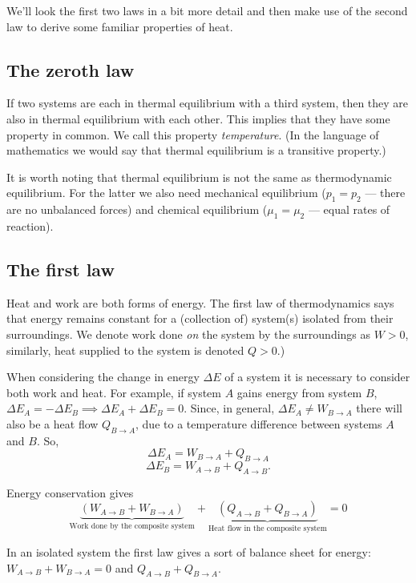 We'll look the first two laws in a bit more detail and then make use of the second law to derive some familiar properties of heat.

\subsection{The zeroth law}
If two systems are each in thermal equilibrium with a third system, then they are also in thermal equilibrium with each other. This implies that they have some property in common. We call this property \emph{temperature}. (In the language of mathematics we would say that thermal equilibrium is a transitive property.)

It is worth noting that thermal equilibrium is not the same as thermodynamic equilibrium. For the latter we also need mechanical equilibrium ($p_1=p_2$ --- there are no unbalanced forces) and chemical equilibrium ($\mu_1=\mu_2$ --- equal rates of reaction).

\subsection{The first law}
Heat and work are both forms of energy. The first law of thermodynamics says that energy remains constant for a (collection of) system(s) isolated from their surroundings. We denote work done \emph{on} the system by the surroundings as $W>0$, similarly, heat supplied to the system is denoted $Q>0$.)

When considering the change in energy $\Delta E$ of a system it is necessary to consider both work and heat. For example, if system $A$ gains energy from system $B$, $\Delta E_A = -\Delta E_B \implies \Delta E_A + \Delta E_B =0$. Since, in general, $\Delta E_A\neq W_{B\rightarrow A}$ there will also be a heat flow $Q_{B\rightarrow A}$, due to a temperature difference between systems $A$ and $B$.
So,
$$\Delta E_A = W_{B\rightarrow A} + Q_{B\rightarrow A}$$
$$\Delta E_B = W_{A\rightarrow B} + Q_{A\rightarrow B}.$$

Energy conservation gives 
$$\underbrace{(W_{A\rightarrow B}+W_{B\rightarrow A})}_{\text{Work done by the composite system}} + \underbrace{(Q_{A\rightarrow B}+Q_{B\rightarrow A})}_{\text{Heat flow in the composite system}} = 0$$

In an isolated system the first law gives a sort of balance sheet for energy:
$W_{A\rightarrow B}+W_{B\rightarrow A} = 0$ and $Q_{A\rightarrow B}+Q_{B\rightarrow A}$.


